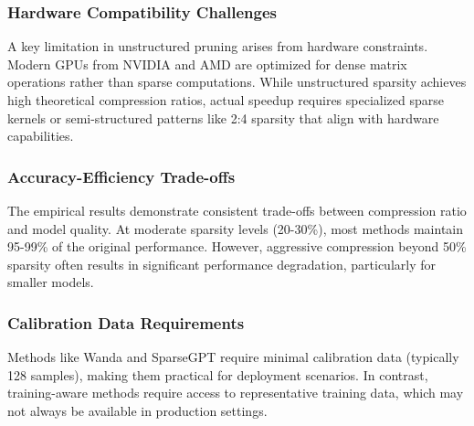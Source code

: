 \subsubsection{Hardware Compatibility Challenges}

A key limitation in unstructured pruning arises from hardware constraints. Modern GPUs from NVIDIA and AMD are optimized for dense matrix operations rather than sparse computations. While unstructured sparsity achieves high theoretical compression ratios, actual speedup requires specialized sparse kernels or semi-structured patterns like 2:4 sparsity that align with hardware capabilities.

\subsubsection{Accuracy-Efficiency Trade-offs}

The empirical results demonstrate consistent trade-offs between compression ratio and model quality. At moderate sparsity levels (20-30\%), most methods maintain 95-99\% of the original performance. However, aggressive compression beyond 50\% sparsity often results in significant performance degradation, particularly for smaller models.

\subsubsection{Calibration Data Requirements}

Methods like Wanda and SparseGPT require minimal calibration data (typically 128 samples), making them practical for deployment scenarios. In contrast, training-aware methods require access to representative training data, which may not always be available in production settings.
